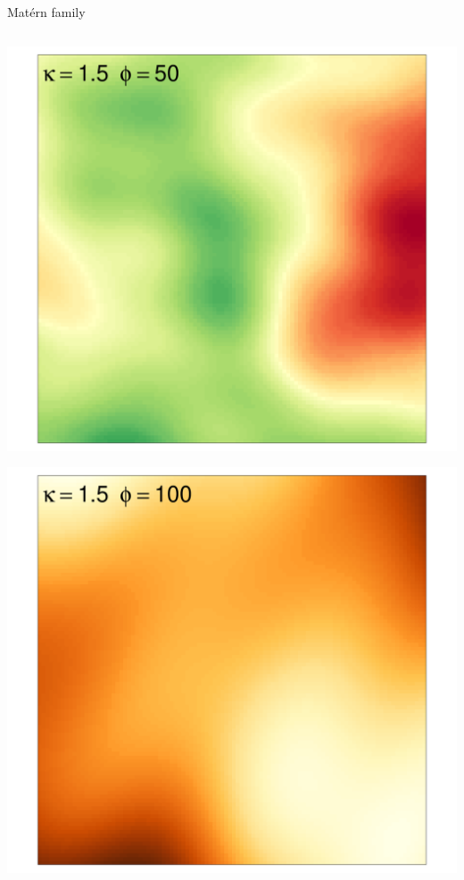 \documentclass[
  ignorenonframetext,
]{beamer}
\begin{document}
\begin{frame}{Matérn family}
\begin{columns}[T]
\begin{column}{0.33\textwidth}
\includegraphics{Lecture_1_files/figure-beamer/unnamed-chunk-37-1.pdf}

\includegraphics{Lecture_1_files/figure-beamer/unnamed-chunk-38-1.pdf}
\end{column}
\end{columns}
\end{frame}
\end{document}
